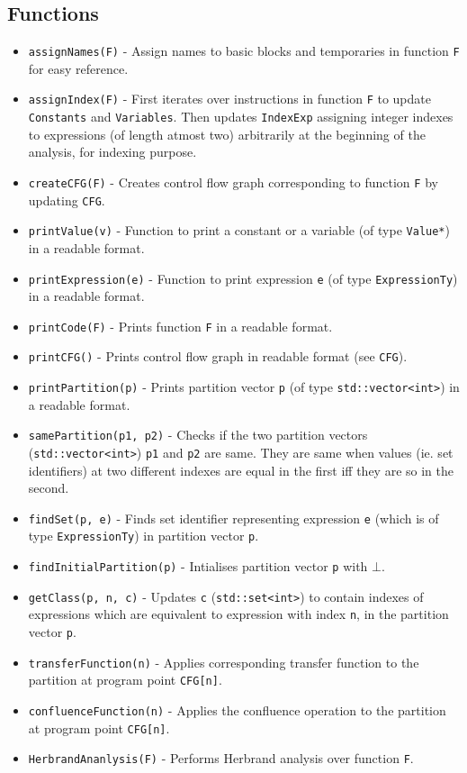 \subsection{Functions}
\label{subsec:FunctionsLLVM}
\begin{itemize} \tightlist
    \item \texttt{assignNames(F)} - Assign names to basic blocks and  temporaries in function \texttt{F} for easy reference.
    \item \texttt{assignIndex(F)} - First iterates over instructions in function \texttt{F} to update \texttt{Constants} and \texttt{Variables}. Then updates \texttt{IndexExp} assigning integer indexes to expressions (of length atmost two) arbitrarily at the beginning of the analysis, for indexing purpose.
    \item \texttt{createCFG(F)} - Creates control flow graph corresponding to function \texttt{F} by updating \texttt{CFG}.
    \item \texttt{printValue(v)} - Function to print a constant or a variable (of type \texttt{Value*}) in a readable format.
    \item \texttt{printExpression(e)} - Function to print expression \texttt{e} (of type \texttt{ExpressionTy}) in a readable format.
    \item \texttt{printCode(F)} - Prints function \texttt{F} in a readable format.
    \item \texttt{printCFG()} - Prints control flow graph in readable format (see \texttt{CFG}).
    \item \texttt{printPartition(p)} - Prints partition vector \texttt{p} (of type \texttt{std::vector<int>}) in a readable format.
    \item \texttt{samePartition(p1, p2)} - Checks if the two partition vectors (\texttt{std::vector<int>}) \texttt{p1} and \texttt{p2} are same. They are same when values (ie. set identifiers) at two different indexes are equal in the first iff they are so in the second.
    \item \texttt{findSet(p, e)} - Finds set identifier representing expression \texttt{e} (which is of type \texttt{ExpressionTy}) in partition vector \texttt{p}.
    \item \texttt{findInitialPartition(p)} - Intialises partition vector \texttt{p} with $\bot$.
    \item \texttt{getClass(p, n, c)} - Updates \texttt{c} (\texttt{std::set<int>}) to contain indexes of expressions which are equivalent to expression with index \texttt{n}, in the partition vector \texttt{p}.
    \item \texttt{transferFunction(n)} - Applies corresponding transfer function to the partition at program point \texttt{CFG[n]}.
    \item \texttt{confluenceFunction(n)} - Applies the confluence operation to the partition at program point \texttt{CFG[n]}.
    \item \texttt{HerbrandAnanlysis(F)} - Performs Herbrand analysis over function \texttt{F}.
\end{itemize}

